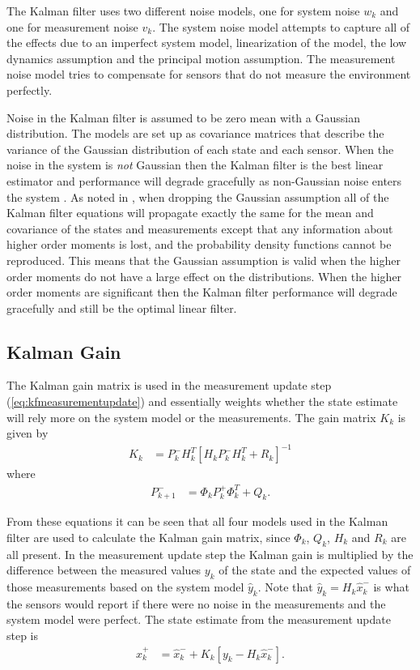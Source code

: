 The Kalman filter uses two different noise models, one for system noise $w_k$ and one for measurement noise $v_k$. The system noise model attempts to capture all of the effects due to an imperfect system model, linearization of the model, the low dynamics assumption and the principal motion assumption. The measurement noise model tries to compensate for sensors that do not measure the environment perfectly.

Noise in the Kalman filter is assumed to be zero mean with a Gaussian distribution. The models are set up as covariance matrices that describe the variance of the Gaussian distribution of each state and each sensor. When the noise in the system is \textit{not} Gaussian then the Kalman filter is the best linear estimator and performance will degrade gracefully as non-Gaussian noise enters the system \cite{Simon10}. As noted in \cite{AndersonMoore79}, when dropping the Gaussian assumption all of the Kalman filter equations will propagate exactly the same for the mean and covariance of the states and measurements except that any information about higher order moments is lost, and the probability density functions cannot be reproduced. This means that the Gaussian assumption is valid when the higher order moments do not have a large effect on the distributions. When the higher order moments are significant then the Kalman filter performance will degrade gracefully and still be the optimal linear filter.

\subsection{Kalman Gain}
\label{kfKalmanGain}
The Kalman gain matrix is used in the measurement update step (\ref{eq:kfmeasurementupdate}) and essentially weights whether the state estimate will rely more on the system model or the measurements. The gain matrix $K_k$ is given by
\begin{align*}
K_k &= P_k^-H_k^T\left[H_kP_k^-H_k^T + R_k\right]^{-1}
\end{align*}
where
\begin{align*}
P_{k+1}^- &= \Phi_kP_k^+\Phi_k^T + Q_k.
\end{align*}

From these equations it can be seen that all four models used in the Kalman filter are used to calculate the Kalman gain matrix, since $\Phi_k$, $Q_k$, $H_k$ and $R_k$ are all present. In the measurement update step the Kalman gain is multiplied by the difference between the measured values $y_k$ of the state and the expected values of those measurements based on the system model $\hat{y}_k$. Note that $\hat{y}_k = H_k\hat{x}_k^-$ is what the sensors would report if there were no noise in the measurements and the system model were perfect. The state estimate from the measurement update step is
\begin{align*}
\hat{x}_k^+ &= \hat{x}_k^- + K_k\left[y_k - H_k\hat{x}_k^-\right].
\end{align*}


